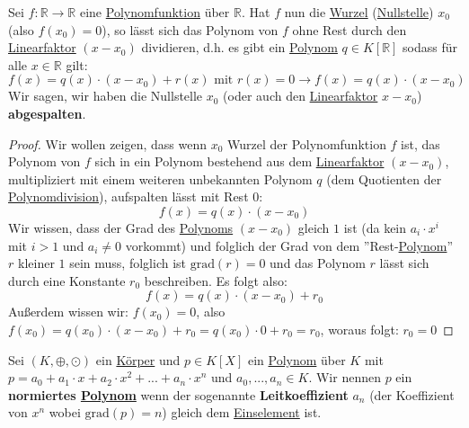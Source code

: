 \documentclass[../../main.tex]{subfiles}
\begin{document}
		\begin{theorem}
			\label{satz:AbspaltenEinerNullstelle}
			Sei $f:\mathbb{R}\rightarrow \mathbb{R}$ eine \hyperref[def:Polynomfunktion]{Polynomfunktion} über $\mathbb{R}$. Hat $f$ nun die \hyperref[def:Wurzel]{Wurzel} (\hyperref[def:Nullstelle]{Nullstelle}) $x_0$ (also $f(x_0)=0$), so lässt sich das Polynom von $f$ ohne Rest durch den \hyperref[def:Linearfaktor]{Linearfaktor} $(x-x_0)$ dividieren, d.h. es gibt ein \hyperref[def:Polynom]{Polynom} $q \in K[\mathbb{R}]$ sodass für alle $x\in \mathbb{R}$ gilt: $$f(x)=q(x)\cdot(x-x_0)+r(x) \textrm{ mit } r(x)=0 \rightarrow f(x)=q(x)\cdot(x-x_0)$$
			Wir sagen, wir haben die Nullstelle $x_0$ (oder auch den \hyperref[def:Linearfaktor]{Linearfaktor} $x-x_0$) \textbf{abgespalten}.
			
			\begin{proof}
				Wir wollen zeigen, dass wenn $x_0$ Wurzel der Polynomfunktion $f$ ist, das Polynom von $f$ sich in ein Polynom bestehend aus dem \hyperref[def:Linearfaktor]{Linearfaktor} $(x-x_0)$, multipliziert mit einem weiteren unbekannten Polynom $q$ (dem Quotienten der \hyperref[def:Polynomdivision]{Polynomdivision}), aufspalten lässt mit Rest 0: $$f(x)=q(x)\cdot(x-x_0)$$
				Wir wissen, dass der Grad des \hyperref[def:Polynom]{Polynoms} $(x-x_0)$ gleich $1$ ist (da kein $a_i \cdot x^i$ mit $i>1$ und $a_i\not =0$ vorkommt) und folglich der Grad von dem ''Rest-\hyperref[def:Polynom]{Polynom}'' $r$ kleiner $1$ sein muss, folglich ist $\textrm{grad}(r)=0$ und das Polynom $r$ lässt sich durch eine Konstante $r_0$ beschreiben. Es folgt also: $$f(x)=q(x) \cdot (x-x_0) + r_0$$
				Außerdem wissen wir: $f(x_0) = 0$, also $f(x_0)=q(x_0)\cdot(x-x_0)+r_0=q(x_0)\cdot 0 + r_0 = r_0$, woraus folgt: $r_0=0$
			\end{proof}
		\end{theorem}
	
		\begin{definition}
			\label{def:Leitkoeffizient}
			\label{def:normiertesPolynom}
			Sei $(K,\oplus, \odot)$ ein \hyperref[def:Körper]{Körper} und $p \in K[X]$ ein \hyperref[def:Polynom]{Polynom} über $K$ mit $p = a_0 + a_1 \cdot x + a_2 \cdot x^2 + ... + a_n \cdot x^n$ und $a_0, ..., a_n \in K$. Wir nennen $p$ ein \textbf{normiertes \hyperref[def:Polynom]{Polynom}} wenn der sogenannte \textbf{Leitkoeffizient} $a_n$ (der Koeffizient von $x^n$ wobei $\textrm{grad}(p)=n$) gleich dem \hyperref[def:Einselement]{Einselement} ist. 
		\end{definition}
	
\end{document}

